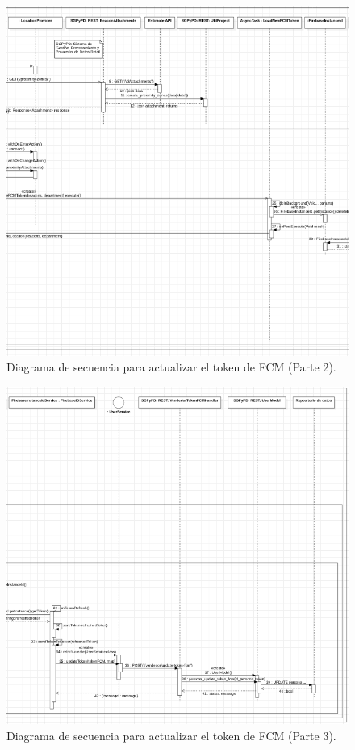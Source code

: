 \FloatBarrier
\begin{figure}[htbp!]
		\centering
			\includegraphics[width=1 \textwidth]{imagenes/adrian/vendedor/prototipoFinal/actualizarFCM2}
		\caption{Diagrama de secuencia para actualizar el token de FCM (Parte 2).}
		\label{secuencia-AIPV4-tokenDos}
\end{figure}
\FloatBarrier

\FloatBarrier
\begin{figure}[htbp!]
		\centering
			\includegraphics[width=1 \textwidth]{imagenes/adrian/vendedor/prototipoFinal/actualizarFCM3}
		\caption{Diagrama de secuencia para actualizar el token de FCM (Parte 3).}
		\label{secuencia-AIPV4-tokenTres}
\end{figure}
\FloatBarrier

